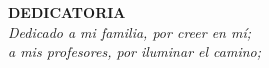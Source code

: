 \begin{adjustwidth}{4cm}{0cm}
  \begin{flushleft}
    \textbf{DEDICATORIA} \\
  \textit{Dedicado a mi familia, por creer en mí;\\
  a mis profesores, por iluminar el camino;}
  \end{flushleft}
\end{adjustwidth}
\vspace{2cm} 
